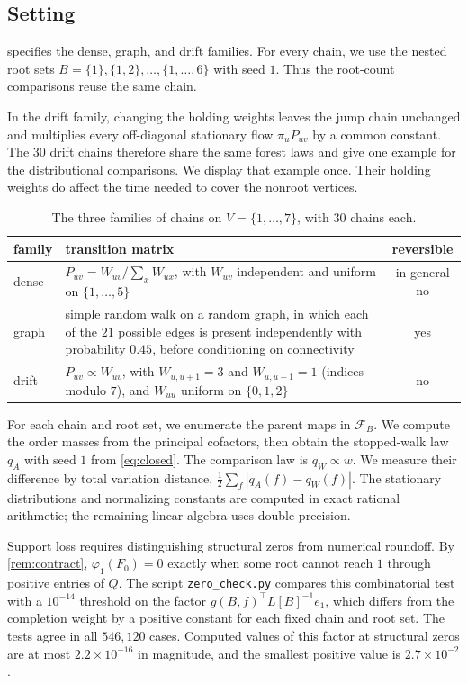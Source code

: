\documentclass[onefignum,onetabnum,nohypdvips]{siamart250211}
\numberwithin{theorem}{section}
\numberwithin{equation}{section}
\newcommand{\Fset}{\mathcal{F}}
\begin{document}
\subsection{Setting}\label{sec:sm-numerics}
 specifies the dense, graph, and drift families.
For every chain, we use the nested root sets
$B=\{1\},\{1,2\},\dots,\{1,\dots,6\}$ with seed $1$. Thus the
root-count comparisons reuse the same chain.

In the drift family, changing the holding weights leaves the jump
chain unchanged and multiplies every off-diagonal stationary flow
$\pi_uP_{uv}$ by a common constant. The $30$ drift chains therefore
share the same forest laws and give one example for the distributional
comparisons. We display that example once. Their holding weights do
affect the time needed to cover the nonroot vertices.

\begin{table}[!htbp]
\caption{The three families of chains on $V=\{1,\dots,7\}$, with $30$
chains each.}\label{tab:families}
\centering
\small
\begin{tabular}{@{}l>{\raggedright\arraybackslash}p{8.2cm}c@{}}
\toprule
family & transition matrix & reversible\\
\midrule
dense & $P_{uv}=W_{uv}/\sum_{x}W_{ux}$, with $W_{uv}$ independent and
uniform on $\{1,\dots,5\}$ & in general no\\
\addlinespace[2pt]
graph & simple random walk on a random graph, in which each of the $21$
possible edges is present independently with probability $0.45$, before
conditioning on connectivity & yes\\
\addlinespace[2pt]
drift & $P_{uv}\propto W_{uv}$, with $W_{u,u+1}=3$ and $W_{u,u-1}=1$
(indices modulo $7$), and $W_{uu}$ uniform on $\{0,1,2\}$ & no\\
\bottomrule
\end{tabular}
\end{table}

For each chain and root set, we enumerate the parent maps in
$\Fset_B$. We compute the order masses from the principal cofactors,
then obtain the stopped-walk law $q_A$ with seed $1$ from
\eqref{eq:closed}. The comparison law is $q_W\propto w$. We measure
their difference by total variation distance,
$\tfrac12\sum_f|q_A(f)-q_W(f)|$. The stationary distributions and
normalizing constants are computed in exact rational arithmetic;
the remaining linear algebra uses double precision.

Support loss requires distinguishing structural zeros from numerical
roundoff. By \cref{rem:contract}, $\varphi_1(F_0)=0$ exactly when some
root cannot reach $1$ through positive entries of $Q$. The script
\nolinkurl{zero_check.py} compares this combinatorial test
with a $10^{-14}$ threshold on the factor
$g(B,f)^{\top}L[B]^{-1}e_1$, which differs from the completion weight
by a positive constant for each fixed chain and root set. The tests
agree in all $546{,}120$ cases. Computed values of this factor at
structural zeros are at most $2.2\times10^{-16}$ in magnitude, and
the smallest positive value is $2.7\times10^{-2}$.
\end{document}
